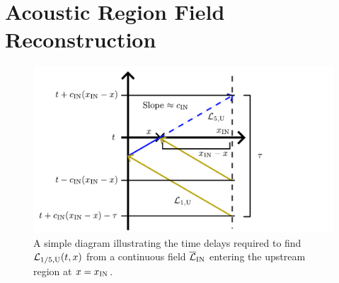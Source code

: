 \section{Acoustic Region Field Reconstruction}

\begin{figure}[t]
\centering
\includegraphics[scale=0.60]{assets/imgs/inlet-adcbc-spatial-field.pdf}
\caption{A simple diagram illustrating the time delays required to find $\cl{L}_{1/5, \rm{U}}(t, x)$ from a continuous field $\overline{\cl{L}}_{\rm{IN}}$ entering the upstream region at $x = x_{\rm{IN}}$.}
\label{fig:field-reconstruction}
\end{figure}

